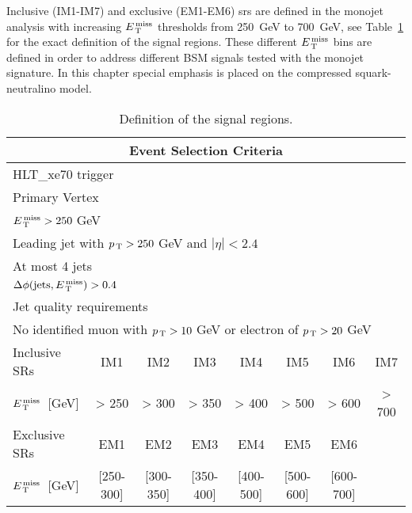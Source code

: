 Inclusive (IM1-IM7) and exclusive (EM1-EM6) \glspl{sr} are defined in the
monojet analysis with increasing $E_\mathrm{\, T}^\mathrm{\, miss}$ thresholds from 250~GeV to 700~GeV, see
Table~\ref{tab:event_selection} for the exact definition of the signal
regions. These different $E_\mathrm{\, T}^\mathrm{\, miss}$ bins are defined in order to address different
BSM signals tested with the monojet signature. In this chapter special emphasis
is placed on the compressed squark-neutralino model.
\begin{table}[!th]
  \centering
  \begin{tabular}{@{}l@{}c@{}c@{}c@{}c@{}c@{}c@{}c}
    \toprule
    \multicolumn{8}{c}{Event Selection Criteria} \\
    \midrule \midrule
    \multicolumn{8}{l}{HLT\_xe70 trigger} \\
    \multicolumn{8}{l}{Primary Vertex} \\
    \multicolumn{8}{l}{$E_\mathrm{\, T}^\mathrm{\, miss} > 250~$GeV} \\
    \multicolumn{8}{l}{Leading jet with $p_\mathrm{\, T} > 250~$GeV and $|\eta| < 2.4$} \\
    \multicolumn{8}{l}{At most 4 jets} \\
    \multicolumn{8}{l}{$\Delta \phi (\mathrm{jets}, E_\mathrm{\, T}^\mathrm{\, miss}) > 0.4$} \\
    \multicolumn{8}{l}{Jet quality requirements} \\
    \multicolumn{8}{l}{No identified muon with $p_\mathrm{\, T} > 10~$GeV or electron of
    $p_\mathrm{\, T} > 20~$GeV} \\
    \midrule
    Inclusive SRs & IM1 & IM2 & IM3 & IM4 & IM5 & IM6 & IM7 \\
    $E_\mathrm{\, T}^\mathrm{\, miss}$~[GeV] & > 250 & > 300 & > 350 & > 400 & > 500 & > 600 & > 700 \\
    \midrule
    Exclusive SRs & EM1 & EM2 & EM3 & EM4 & EM5 & EM6 \\
    $E_\mathrm{\, T}^\mathrm{\, miss}$~[GeV] & [250-300] & [300-350] & [350-400] & [400-500] &
    [500-600] & [600-700] \\
    \bottomrule
  \end{tabular}
  \caption{Definition of the signal regions.}
  \label{tab:event_selection}
\end{table}
